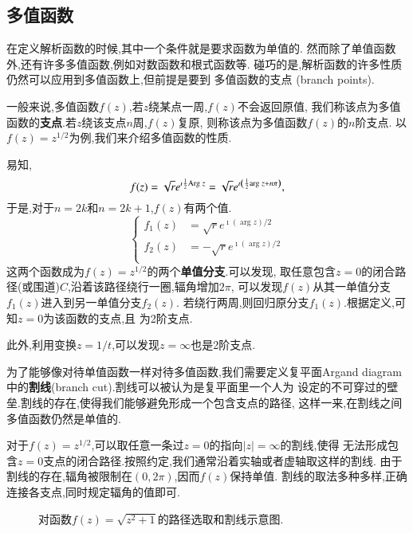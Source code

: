 \subsection{多值函数}
在定义解析函数的时候,其中一个条件就是要求函数为单值的.
然而除了单值函数外,还有许多多值函数,例如对数函数和根式函数等.
碰巧的是,解析函数的许多性质仍然可以应用到多值函数上,但前提是要到
多值函数的支点 (branch points).

一般来说,多值函数$f(z)$,若$z$绕某点一周,$f(z)$不会返回原值,
我们称该点为多值函数的\textbf{支点}.若$z$绕该支点$n$周,$f(z)$复原,
则称该点为多值函数$f(z)$的$n$阶支点.
以$f(z) = z^{1/2}$为例,我们来介绍多值函数的性质.

易知,\[
    f(z) = \sqrt{r} e^{\imath {\frac{1}{2}}  {\mathrm{Arg}\;} z}
    =  \sqrt{r} e^{\imath \left( {\frac{1}{2}} {\mathrm{arg}\;} z + n \pi \right)},
    \]
于是,对于$n= 2k$和$n=2k+1$,$f(z)$有两个值.
\begin{equation}
    \left\{\begin{aligned}
    f_1(z) & =\sqrt{r}  e^{\imath(\arg z) / 2} \\
    f_2(z) & =-\sqrt{r}  e^{\imath(\arg z) / 2} \\
    \end{aligned}\right.
\end{equation}
这两个函数成为$f(z)= z^{1/2}$的两个\textbf{单值分支}.可以发现,
取任意包含$z=0$的闭合路径(或围道)$C$,沿着该路径绕行一圈,辐角增加$2\pi$,
可以发现$f(z)$从其一单值分支$f_1(z)$进入到另一单值分支$f_2(z)$.
若绕行两周,则回归原分支$f_1(z)$.根据定义,可知$z=0$为该函数的支点,且
为2阶支点.

此外,利用变换$z=1/t$,可以发现$z=\infty$也是2阶支点.

为了能够像对待单值函数一样对待多值函数,我们需要定义复平面Argand diagram
中的\textbf{割线}(branch cut).割线可以被认为是复平面里一个人为
设定的不可穿过的壁垒.割线的存在,使得我们能够避免形成一个包含支点的路径,
这样一来,在割线之间多值函数仍然是单值的.

对于$f(z)=z^{1/2}$,可以取任意一条过$z=0$的指向$|z|=\infty$的割线,使得
无法形成包含$z=0$支点的闭合路径.按照约定,我们通常沿着实轴或者虚轴取这样的割线.
由于割线的存在,辐角被限制在$(0,2\pi)$,因而$f(z)$保持单值.
割线的取法多种多样,正确连接各支点,同时规定辐角的值即可.

\begin{figure}[htbp]
    \centering
    
    \caption{对函数$f(z) = \sqrt{z^2 + 1}$的路径选取和割线示意图.}
    \label{fig:contours}
\end{figure}

